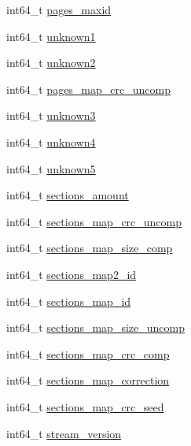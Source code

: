 \begin{DoxyCompactItemize}
\item 
int64\-\_\-t \hyperlink{structr2007__file__header_a3d036f69508e8728c08c1c395acaecd1}{pages\-\_\-maxid}
\item 
int64\-\_\-t \hyperlink{structr2007__file__header_a983027ac746cbd6ca8d4e9f471404319}{unknown1}
\item 
int64\-\_\-t \hyperlink{structr2007__file__header_ac8166c05c19617087d6ce5b739b53666}{unknown2}
\item 
int64\-\_\-t \hyperlink{structr2007__file__header_abad07f4247a56c90342463a1eb7015e5}{pages\-\_\-map\-\_\-crc\-\_\-uncomp}
\item 
int64\-\_\-t \hyperlink{structr2007__file__header_ad907176a76e0c3a63a5d653394260c63}{unknown3}
\item 
int64\-\_\-t \hyperlink{structr2007__file__header_a4b70e082bf75347b4c95dcb9202735a1}{unknown4}
\item 
int64\-\_\-t \hyperlink{structr2007__file__header_aa2be13496a9a88fcbcaeb76b030114f5}{unknown5}
\item 
int64\-\_\-t \hyperlink{structr2007__file__header_aba9b0ebfde0e3a600b861da11798f7d1}{sections\-\_\-amount}
\item 
int64\-\_\-t \hyperlink{structr2007__file__header_aa7202918331a6659e785e9ab3d914ef4}{sections\-\_\-map\-\_\-crc\-\_\-uncomp}
\item 
int64\-\_\-t \hyperlink{structr2007__file__header_a2d9fce00cec509e1fdc44864596305bc}{sections\-\_\-map\-\_\-size\-\_\-comp}
\item 
int64\-\_\-t \hyperlink{structr2007__file__header_adf40ffa9ea319b43c4d032d180d73dd9}{sections\-\_\-map2\-\_\-id}
\item 
int64\-\_\-t \hyperlink{structr2007__file__header_a349bdbad1d133580abbed60ced836514}{sections\-\_\-map\-\_\-id}
\item 
int64\-\_\-t \hyperlink{structr2007__file__header_a9189c48580278db8f2bfbdfd2f095dea}{sections\-\_\-map\-\_\-size\-\_\-uncomp}
\item 
int64\-\_\-t \hyperlink{structr2007__file__header_a1944d36c1ab42a7ff9462f842221b1ff}{sections\-\_\-map\-\_\-crc\-\_\-comp}
\item 
int64\-\_\-t \hyperlink{structr2007__file__header_a186230d7651c706bc19fa05816e19cbd}{sections\-\_\-map\-\_\-correction}
\item 
int64\-\_\-t \hyperlink{structr2007__file__header_a5ea144a715afd677fc6bc80b0a4a7a5f}{sections\-\_\-map\-\_\-crc\-\_\-seed}
\item 
int64\-\_\-t \hyperlink{structr2007__file__header_a1275f2ed20672726efd76e123e5cdb12}{stream\-\_\-version}

\end{DoxyCompactItemize}
